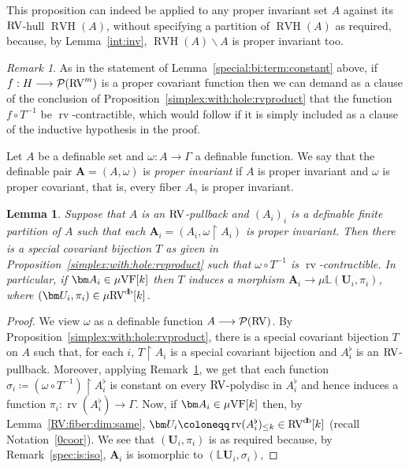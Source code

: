 \documentclass[12pt]{amsart}
\newcommand{\memph}[1]{{\color{magenta}\emph{#1}}}
\theoremstyle{plain}
\newtheorem{lem}[thm]{Lemma}
\theoremstyle{definition}
\theoremstyle{remark}
\newtheorem{rem}[thm]{Remark}
\numberwithin{equation}{section}
\theoremstyle{plain}
\newcommand{\VF}{\textup{VF}}
\newcommand{\RV}{\textup{RV}}
\newcommand{\0}{\emptyset}
\newcommand{\mdl}[1]{\mathcal{#1}}  %
\newcommand{\bb}[1]{\mathbb{#1}}
\newcommand{\rest}{\upharpoonright}
\newcommand{\fun}{\longrightarrow}
\newcommand{\mi}{\smallsetminus}
\newcommand{\mVF}{{\mu}{\VF}}
\newcommand{\mRV}{{\mu}{\RV}}
\newcommand{\mL}{{\mu}{\bb L}}
\DeclareMathOperator{\rv}{rv}
\DeclareMathOperator{\RVH}{RVH}
\DeclareMathOperator{\db}{d \! b}
\begin{document}
This proposition can indeed be applied to any proper invariant set $A$ against its $\RV$-hull $\RVH(A)$, without specifying a partition of $\RVH(A)$ as required, because, by  Lemma~\ref{int:inv},   $\RVH(A) \mi A$ is proper invariant too.

\begin{rem}\label{cons:extra}
As in the statement of Lemma~\ref{special:bi:term:constant} above, if $f : H \fun \mdl P(\RV^m)$ is a proper covariant function then we can demand as a clause of the conclusion of Proposition~\ref{simplex:with:hole:rvproduct} that the function $f \circ T^{-1}$ be $\rv$-contractible, which would follow if it is simply included as a clause of the inductive hypothesis in the proof.
\end{rem}

Let $A$ be a definable set and $\omega : A \fun \Gamma$ a definable function. We say that the definable pair $\bm A = (A, \omega)$ is \memph{proper invariant} if $A$ is proper invariant and $\omega$ is proper covariant, that is, every fiber $A_\gamma$ is proper invariant.

\begin{lem}\label{L:measure:surjective}
Suppose that $A$ is an $\RV$-pullback and  $(A_i)_i$ is a definable finite partition of $A$ such that each $\bm A_i = (A_i, \omega \rest A_i)$ is proper invariant. Then there is a special covariant bijection $T$ as given in Proposition~\ref{simplex:with:hole:rvproduct} such that $\omega \circ T^{-1}$ is $\rv$-contractible. In particular, if $\bm A_i \in \mVF[k]$ then $T$ induces a morphism  $\bm A_i \fun \mL(\bm U_i, \pi_i)$, where $(\bm U_i, \pi_i) \in \mRV^{\db}[k]$.
\end{lem}
\begin{proof}
We view $\omega$ as a definable function $A \fun \mdl P(\RV)$. By Proposition~\ref{simplex:with:hole:rvproduct}, there is a special covariant bijection $T$ on $A$ such that, for each $i$, $T \rest A_{i}$ is a special covariant bijection and $A_{i}^\flat$ is an $\RV$-pullback. Moreover, applying Remark~\ref{cons:extra}, we get that each function $\sigma_i \coloneqq (\omega \circ T^{-1}) \rest A_{i}^\flat$ is constant on every $\RV$-polydisc in $A_{i}^\flat$ and hence induces a function $\pi_i : \rv(A_{i}^\flat) \fun \Gamma$. Now, if $\bm A_i \in \mVF[k]$ then, by Lemma~\ref{RV:fiber:dim:same}, $\bm U_i\coloneqq \rv(A_{i}^\flat)_{\leq k} \in \RV^{\db}[k]$ (recall Notation~\ref{0coor}). We see that $(\bm U_i, \pi_i)$ is as required because, by Remark~\ref{spec:is:iso}, $\bm A_i$ is isomorphic to $(\mathbb{L} \bm U_i, \sigma_i)$,
\end{proof}
\end{document}
